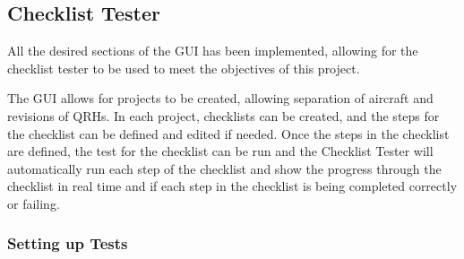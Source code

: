 \documentclass[../dissertation.tex]{subfiles}
\begin{document}
\subsection{Checklist Tester}

All the desired sections of the GUI has been implemented, allowing for
the checklist tester to be used to meet the objectives of this project.

The GUI allows for projects to be created, allowing separation of aircraft and
revisions of QRHs. In each project, checklists can be created, and the steps
for the checklist can be defined and edited if needed. Once the steps in
the checklist are defined, the test for the checklist can be run
and the Checklist Tester will automatically run each step of the checklist
and show the progress through the checklist in real time and if each step
in the checklist is being completed correctly or failing.

\subsubsection{Setting up Tests}
\end{document}
